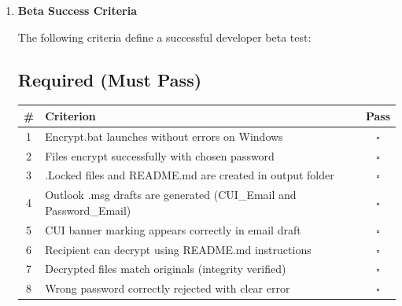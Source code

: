 \documentclass[11pt,letterpaper]{article}
\newcommand{\dmsection}[1]{\item \textbf{#1}\par}
\begin{document}
\begin{enumerate}
\begin{verbatim}
Files ready to send:
  C:\Users\Dev\Documents\SendCUIEmail_20260121_143022\Document.pdf.Locked
  C:\Users\Dev\Documents\SendCUIEmail_20260121_143022\README.md
\end{verbatim}

\textbf{Files Modified:}
\begin{itemize}
    \item \texttt{Encrypt.ps1} -- Final summary section
    \item \texttt{Decrypt.ps1} -- Final summary section
\end{itemize}

\subsection*{Deferred Items}

\begin{itemize}
    \item \textbf{Weak Password Warning} -- Deferred for developer beta; add if feedback indicates need
    \item \textbf{Quick-Start Guide PDF} -- Deferred until non-technical user release
\end{itemize}

\dmsection{Beta Success Criteria}

The following criteria define a successful developer beta test:

\subsection*{Required (Must Pass)}

\begin{tabularx}{\textwidth}{|c|X|c|}
\hline
\textbf{\#} & \textbf{Criterion} & \textbf{Pass} \\
\hline
1 & Encrypt.bat launches without errors on Windows & $\square$ \\
\hline
2 & Files encrypt successfully with chosen password & $\square$ \\
\hline
3 & .Locked files and README.md are created in output folder & $\square$ \\
\hline
4 & Outlook .msg drafts are generated (CUI\_Email and Password\_Email) & $\square$ \\
\hline
5 & CUI banner marking appears correctly in email draft & $\square$ \\
\hline
6 & Recipient can decrypt using README.md instructions & $\square$ \\
\hline
7 & Decrypted files match originals (integrity verified) & $\square$ \\
\hline
8 & Wrong password correctly rejected with clear error & $\square$ \\
\hline
\end{tabularx}


\end{enumerate}
\end{document}
